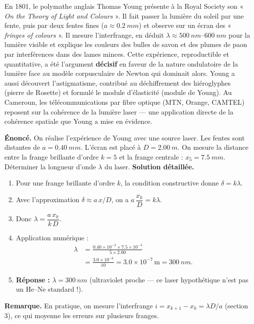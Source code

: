 \documentclass[11pt]{article}
\newcommand{\cle}[1]{{\popxbold\color{popdark}#1}}
\begin{document}
\begin{savaistu}
En 1801, le polymathe anglais Thomas Young présente à la Royal Society son « \emph{On the Theory of Light and Colours} ». Il fait passer la lumière du soleil par une fente, puis par deux fentes fines ($a \approx \SI{0,2}{mm}$) et observe sur un écran des « \emph{fringes of colours} ». Il mesure l'interfrange, en déduit $\lambda \approx \SIrange{500}{600}{nm}$ pour la lumière visible et explique les couleurs des bulles de savon et des plumes de paon par interférences dans des lames minces. Cette expérience, reproductible et quantitative, a été l'argument \textbf{décisif} en faveur de la \cle{nature ondulatoire de la lumière} face au modèle corpusculaire de Newton qui dominait alors. Young a aussi découvert l'astigmatisme, contribué au déchiffrement des hiéroglyphes (pierre de Rosette) et formulé le module d'élasticité (module de Young). Au Cameroun, les télécommunications par fibre optique (MTN, Orange, CAMTEL) reposent sur la cohérence de la lumière laser — une application directe de la cohérence spatiale que Young a mise en évidence.
\end{savaistu}

\begin{exoresolu}
\textbf{Énoncé.} On réalise l'expérience de Young avec une source laser. Les fentes sont distantes de $a = \SI{0,40}{mm}$. L'écran est placé à $D = \SI{2,00}{m}$. On mesure la distance entre la frange brillante d'ordre $k=5$ et la frange centrale : $x_5 = \SI{7,5}{mm}$. Déterminer la longueur d'onde $\lambda$ du laser.
\tcblower
\textbf{Solution détaillée.}
\begin{enumerate}
  \item Pour une frange brillante d'ordre $k$, la condition constructive donne $\delta = k\lambda$.
  \item Avec l'approximation $\delta \approx a\,x/D$, on a $a\,\dfrac{x_k}{D} = k\lambda$.
  \item Donc $\lambda = \dfrac{a\,x_k}{k\,D}$.
  \item Application numérique :
  \begin{align*}
  \lambda &= \frac{0.40 \times 10^{-3} \times 7.5 \times 10^{-3}}{5 \times 2.00} \\
  &= \frac{3.0 \times 10^{-6}}{10} = 3.0 \times 10^{-7}\,\text{m} = \SI{300}{nm}.
  \end{align*}
  \item \textbf{Réponse :} $\lambda = \SI{300}{nm}$ (ultraviolet proche — ce laser hypothétique n'est pas un He–Ne standard !).
\end{enumerate}
\textbf{Remarque.} En pratique, on mesure l'interfrange $i = x_{k+1} - x_k = \lambda D/a$ (section 3), ce qui moyenne les erreurs sur plusieurs franges.
\end{exoresolu}
\end{document}
